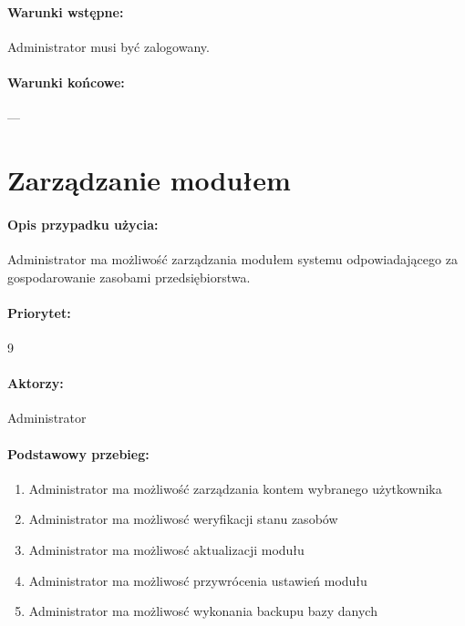 \documentclass[11pt, a4paper, oneside]{report}
\begin{document}
\paragraph{Warunki wstępne:} Administrator musi być zalogowany.
\paragraph{Warunki końcowe:} ---

\section{Zarządzanie modułem}
\paragraph{Opis przypadku użycia:} Administrator ma możliwość zarządzania modułem systemu odpowiadającego za gospodarowanie zasobami przedsiębiorstwa.
\paragraph{Priorytet:} 9
\paragraph{Aktorzy:} Administrator
\paragraph{Podstawowy przebieg:}
\begin{enumerate}
\item Administrator ma możliwość zarządzania kontem wybranego użytkownika
\item Administrator ma możliwosć weryfikacji stanu zasobów
\item Administrator ma możliwosć aktualizacji modułu 
\item Administrator ma możliwosć przywrócenia ustawień modułu
\item Administrator ma możliwosć wykonania backupu bazy danych
\end{enumerate}
\end{document}
